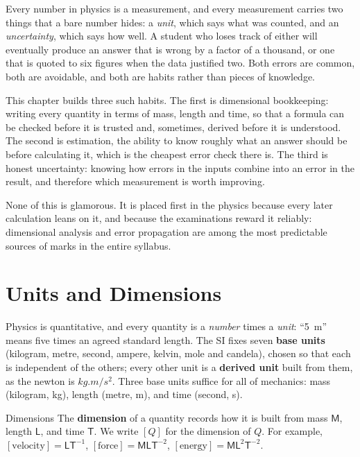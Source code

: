 \label{ch:measurement}

Every number in physics is a measurement, and every measurement carries two things that a bare number
hides: a \emph{unit}, which says what was counted, and an \emph{uncertainty}, which says how well. A
student who loses track of either will eventually produce an answer that is wrong by a factor of a
thousand, or one that is quoted to six figures when the data justified two. Both errors are common,
both are avoidable, and both are habits rather than pieces of knowledge.

This chapter builds three such habits. The first is dimensional bookkeeping: writing every quantity in
terms of mass, length and time, so that a formula can be checked before it is trusted and, sometimes,
derived before it is understood. The second is estimation, the ability to know roughly what an answer
should be before calculating it, which is the cheapest error check there is. The third is honest
uncertainty: knowing how errors in the inputs combine into an error in the result, and therefore which
measurement is worth improving.

None of this is glamorous. It is placed first in the physics because every
later calculation leans on it, and because the examinations reward it reliably: dimensional analysis
and error propagation are among the most predictable sources of marks in the entire syllabus.

\section{Units and Dimensions}

Physics is quantitative, and every quantity is a \emph{number} times a \emph{unit}: ``\SI{5}{m}''
means five times an agreed standard length. The SI fixes seven \textbf{base units} (kilogram, metre,
second, ampere, kelvin, mole and candela), chosen so that each is independent of the others; every
other unit is a \textbf{derived unit} built from them, as the newton is $\si{kg.m/s^2}$. Three base units
suffice for all of mechanics: mass (kilogram, kg), length (metre, m), and time (second, s).

\begin{defbox}{Dimensions}
The \textbf{dimension} of a quantity records how it is built from mass $\mathsf{M}$, length
$\mathsf{L}$, and time $\mathsf{T}$. We write $[Q]$ for the dimension of $Q$. For example,
$[\text{velocity}]=\mathsf{L}\mathsf{T}^{-1}$, $[\text{force}]=\mathsf{M}\mathsf{L}\mathsf{T}^{-2}$,
$[\text{energy}]=\mathsf{M}\mathsf{L}^2\mathsf{T}^{-2}$.
\end{defbox}

